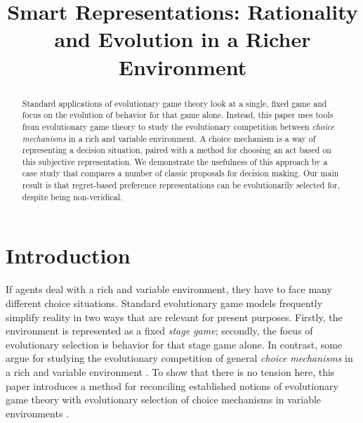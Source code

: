 \documentclass[fleqn,reqno,12pt]{article}
\title{Smart Representations: {R}ationality and Evolution in a Richer  Environment}
\date{}
\theoremstyle{Satz}
\theoremstyle{Bsp}
\begin{document}
\maketitle

\begin{abstract}
\normalsize
  Standard applications of evolutionary game theory look at a single, fixed game and focus on
  the evolution of behavior for that game alone. Instead, this paper uses tools from
  evolutionary game theory to study the evolutionary competition between \emph{choice
    mechanisms} in a rich and variable environment. A choice mechanism is a way of representing
  a decision situation, paired with a method for choosing an act based on this 
  subjective representation. We demonstrate the usefulness of this approach by a case study
  that compares a number of classic proposals for decision making. Our
  main result is that regret-based preference representations can be evolutionarily selected
  for, despite being non-veridical.
\end{abstract}

\newpage

\section{Introduction}
\label{sec:intr--motiv}



If agents deal with a rich and variable environment, they have to face many different choice
situations.
Standard evolutionary game models frequently
simplify reality in two ways that are relevant for present purposes. Firstly, the environment
is represented as a fixed \emph{stage game}; secondly, the focus of
evolutionary selection is behavior for that stage game alone. In contrast, some argue for
studying the evolutionary competition of general \emph{choice mechanisms} in a rich and
variable environment
\citep[e.g.,][]{FawcettHamblin2013:Exposing-the-be,McNamara2013:Towards-a-Riche,HammStev12}. To show that
there is no tension here, this paper introduces a method for reconciling established notions of
evolutionary game theory with evolutionary selection of choice mechanisms in variable
environments \citep[see, inter alia, related work
by][]{Harley1981:Learning-the-Ev,ZollmanSmead2010:Plasticity-and-,SmeadZollman2013:The-Stability-o,OConnor2016:Evolving-to-Gen}.
\end{document}
